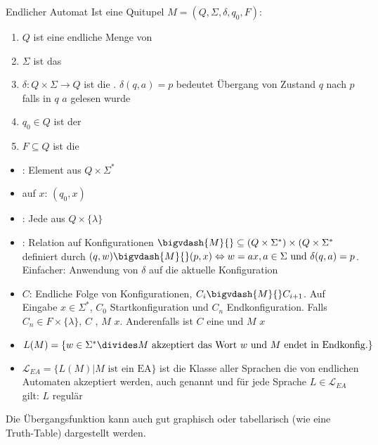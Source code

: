 \begin{definition}[]{Endlicher Automat}
    Ist eine Quitupel $M = (Q, \Sigma, \delta, q_0, F)$:
    \begin{enumerate}[label=\textit{(\roman*)}]
        \item $Q$ ist eine endliche Menge von 
        \item $\Sigma$ ist das 
        \item $\delta: Q \times \Sigma \rightarrow Q$ ist die . $\delta(q, a) = p$ bedeutet Übergang von Zustand $q$ nach $p$ falls in $q$ $a$ gelesen wurde
        \item $q_0 \in Q$ ist der 
        \item $F \subseteq Q$ ist die 
    \end{enumerate}
    \rmvspace
    \rmvspace
    \begin{multicols}{2}
        \begin{itemize}
            \item {}: Element aus $Q \times \Sigma^*$
            \item {} auf $x$: $(q_0, x)$
            \item {}: Jede aus $Q \times \{ \lambda \}$
        \end{itemize}
    \end{multicols}
    \rmvspace
    \rmvspace
    \begin{itemize}
        \item {}: Relation auf Konfigurationen $\bigvdash{M}{} \subseteq (Q \times \Sigma^*) \times (Q \times \Sigma^*$ definiert durch $(q, w) \bigvdash{M}{} (p, x) \Leftrightarrow w = ax, a \in \Sigma \text{ und } \delta(q, a) = p$. Einfacher: Anwendung von $\delta$ auf die aktuelle Konfiguration
        \item {} $C$: Endliche Folge von Konfigurationen, $C_i \bigvdash{M}{} C_{i + 1}$.
              Auf Eingabe $x \in \Sigma^*$, $C_0$ Startkonfiguration und $C_n$ Endkonfiguration.
              Falls $C_n \in F \times \{ \lambda \}$, $C$ , $M$  $x$.
              Anderenfalls ist $C$ eine  und $M$  $x$
        \item {} $L(M) = \{ w \in \Sigma^* \divides \text{$M$ akzeptiert das Wort } w \text{ und $M$ endet in Endkonfig.} \}$
        \item $\mathcal{L}_{EA} = \{ L(M) | M \text{ ist ein EA}\}$ ist die Klasse aller Sprachen die von endlichen Automaten akzeptiert werden, auch genannt  und für jede Sprache $L \in \mathcal{L}_{EA}$ gilt: $L$ regulär
    \end{itemize}
\end{definition}
Die Übergangsfunktion kann auch gut graphisch oder tabellarisch (wie eine Truth-Table) dargestellt werden.

